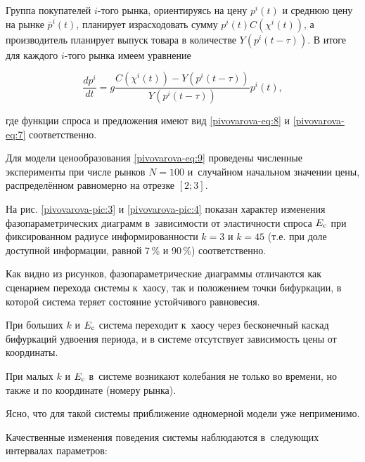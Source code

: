 Группа покупателей $i$-того рынка, ориентируясь на цену $p^{i} (t)$ и среднюю цену на рынке $\bar{p}_{}^{i} (t)$, планирует израсходовать сумму $p^{i} (t)C\left(\chi^{i} (t)\right)$, а производитель планирует выпуск товара в количестве $Y\left(p^{i} \left(t-\tau \right)\right)$. В итоге для каждого $i$-того рынка имеем уравнение

\begin{equation}  

\frac{dp^{i} }{dt} =g\frac{C\left(\chi^{i} (t) \right)-Y\left(p^{i} (t-\tau )\right)}{Y\left(p^{i} (t-\tau )\right)} p^{i} (t),  

\label{pivovarova-eq:9}

\end{equation}

где функции спроса и предложения имеют вид \eqref{pivovarova-eq:8} и \eqref{pivovarova-eq:7} соответственно. \pagebreak









Для модели ценообразования \eqref{pivovarova-eq:9} проведены численные эксперименты при числе рынков $N=100$ и~случайном начальном значении цены, распределённом равномерно на отрезке $[2; 3]$. 

На рис. \ref{pivovarova-pic:3} и \ref{pivovarova-pic:4}  показан характер изменения фазопараметрических диаграмм в~зависимости от эластичности спроса $E_{\rm c} $ при фиксированном радиусе информированности $k=3$ и $k=45$ (т.е. при доле доступной информации, равной 7\,\% и 90\,\%) соответственно.  

Как видно из рисунков, фазопараметрические диаграммы отличаются как сценарием перехода системы к~хаосу, так и положением точки бифуркации, в которой система теряет состояние  устойчивого равновесия.







При больших $k$ и $E_{\rm c} $ система переходит к~хаосу через бесконечный каскад бифуркаций удвоения периода, и в системе отсутствует зависимость цены от координаты. 

При малых $k$ и $E_{\rm c} $ в~системе возникают колебания не только во времени, но также и по координате (номеру рынка). 

Ясно, что для такой системы приближение одномерной модели уже неприменимо. 

Качественные изменения поведения системы наблюдаются в~следующих интервалах параметров: 

